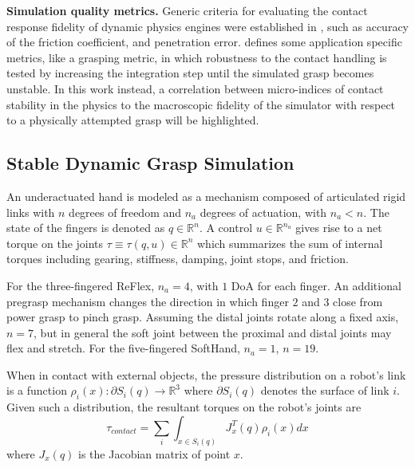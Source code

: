


{\bf Simulation quality metrics.}
Generic criteria for evaluating the contact response fidelity of dynamic physics engines were established in \cite{Boeing07}, such as accuracy of the friction coefficient, and penetration error. \cite{Erez15} defines some application specific metrics, like a grasping metric, in which robustness to the contact handling is tested by increasing the integration step until the simulated grasp becomes unstable.  In this work instead, a correlation between micro-indices of contact stability in the physics to the macroscopic fidelity of the simulator with respect to a physically attempted grasp will be highlighted.

\subsection{Stable Dynamic Grasp Simulation}
\label{methods}

An underactuated hand is modeled as a mechanism composed of articulated rigid links with $n$ degrees of freedom and $n_a$ degrees of actuation, with $n_a < n$.  The state of the fingers is denoted as $q \in \mathbb{R}^n$.  A control $u \in \mathbb{R}^{n_a}$ gives rise to a net torque on the joints $\tau \equiv \tau(q,u) \in \mathbb{R}^n$ which summarizes the sum of internal torques including gearing, stiffness, damping, joint stops, and friction.

For the three-fingered ReFlex, $n_a=4$, with $1$ DoA for each finger. An additional pregrasp mechanism changes the direction in which finger $2$ and $3$ close from power grasp to pinch grasp. Assuming the distal joints rotate along a fixed axis, $n=7$, but in general the soft joint between the proximal and distal joints may flex and stretch.
For the five-fingered SoftHand, $n_a=1$, $n=19$.

When in contact with external objects, the pressure distribution on a robot's link is a function $\rho_i(x):\partial S_i(q) \rightarrow \mathbb{R}^3$ where $\partial S_i(q)$ denotes the surface of link $i$. Given such a distribution, the resultant torques on the robot's joints are 
\begin{equation}
\tau_{contact} = \sum_i \int_{x\in S_i(q)} J_{x}^T(q) \rho_i(x) dx
\end{equation} where $J_{x}(q)$ is the Jacobian matrix of point $x$.

